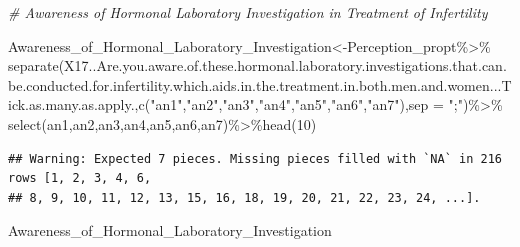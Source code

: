 \documentclass[
]{article}
\newenvironment{Shaded}{\begin{snugshade}}{\end{snugshade}}
\newcommand{\AttributeTok}[1]{\textcolor[rgb]{0.77,0.63,0.00}{#1}}
\newcommand{\CommentTok}[1]{\textcolor[rgb]{0.56,0.35,0.01}{\textit{#1}}}
\newcommand{\DecValTok}[1]{\textcolor[rgb]{0.00,0.00,0.81}{#1}}
\newcommand{\FunctionTok}[1]{\textcolor[rgb]{0.00,0.00,0.00}{#1}}
\newcommand{\NormalTok}[1]{#1}
\newcommand{\OtherTok}[1]{\textcolor[rgb]{0.56,0.35,0.01}{#1}}
\newcommand{\SpecialCharTok}[1]{\textcolor[rgb]{0.00,0.00,0.00}{#1}}
\newcommand{\StringTok}[1]{\textcolor[rgb]{0.31,0.60,0.02}{#1}}
\begin{document}
\begin{Shaded}
\begin{Highlighting}[]
\CommentTok{\# Awareness of Hormonal Laboratory Investigation in Treatment of Infertility}

\NormalTok{Awareness\_of\_Hormonal\_Laboratory\_Investigation}\OtherTok{\textless{}{-}}\NormalTok{Perception\_propt}\SpecialCharTok{\%\textgreater{}\%}
  \FunctionTok{separate}\NormalTok{(X17..Are.you.aware.of.these.hormonal.laboratory.investigations.that.can.be.conducted.for.infertility.which.aids.in.the.treatment.in.both.men.and.women...Tick.as.many.as.apply.,}\FunctionTok{c}\NormalTok{(}\StringTok{"an1"}\NormalTok{,}\StringTok{"an2"}\NormalTok{,}\StringTok{"an3"}\NormalTok{,}\StringTok{"an4"}\NormalTok{,}\StringTok{"an5"}\NormalTok{,}\StringTok{"an6"}\NormalTok{,}\StringTok{"an7"}\NormalTok{),}\AttributeTok{sep =} \StringTok{";"}\NormalTok{)}\SpecialCharTok{\%\textgreater{}\%}
  \FunctionTok{select}\NormalTok{(an1,an2,an3,an4,an5,an6,an7)}\SpecialCharTok{\%\textgreater{}\%}\FunctionTok{head}\NormalTok{(}\DecValTok{10}\NormalTok{)}
\end{Highlighting}
\end{Shaded}

\begin{verbatim}
## Warning: Expected 7 pieces. Missing pieces filled with `NA` in 216 rows [1, 2, 3, 4, 6,
## 8, 9, 10, 11, 12, 13, 15, 16, 18, 19, 20, 21, 22, 23, 24, ...].
\end{verbatim}

\begin{Shaded}
\begin{Highlighting}[]
\NormalTok{Awareness\_of\_Hormonal\_Laboratory\_Investigation}
\end{Highlighting}
\end{Shaded}
\end{document}
